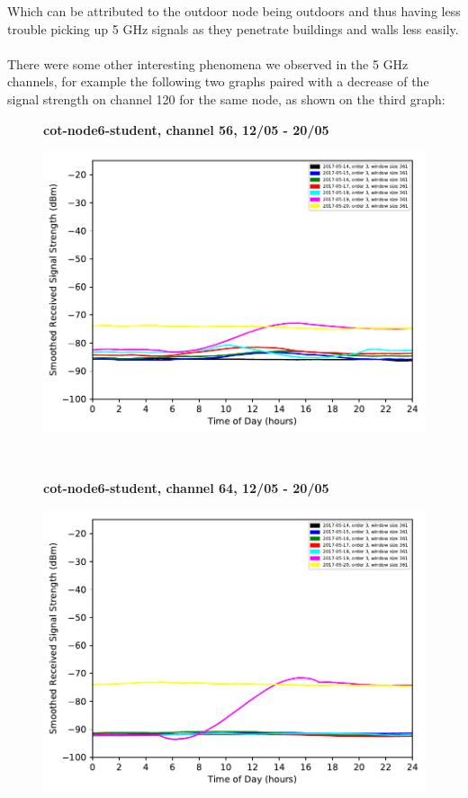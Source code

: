 Which can be attributed to the outdoor node being outdoors and thus having less trouble picking up 5 GHz signals as they penetrate buildings and walls less easily.\\  \\
There were some other interesting phenomena we observed in the 5 GHz channels, for example the following two graphs paired with a decrease of the signal strength on channel 120 for the same node, as shown on the third graph: \newpage
\begin{figure}[h!]
    \centering
    \textbf{cot-node6-student, channel 56, 12/05 - 20/05}\par\medskip
	\includegraphics[scale=0.5]{images/5_GHz/cot-node6-student_2017-05-20_chan56_image.pdf}
\end{figure}\\
\begin{figure}[h!]
    \centering
    \textbf{cot-node6-student, channel 64, 12/05 - 20/05}\par\medskip
	\includegraphics[scale=0.5]{images/5_GHz/cot-node6-student_2017-05-20_chan64_image.pdf}
\end{figure}\\

